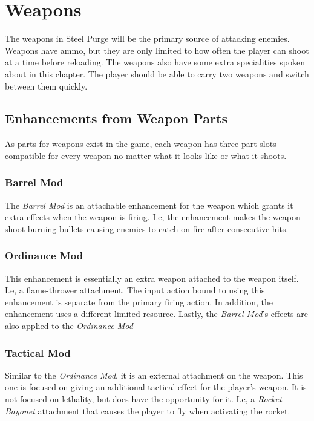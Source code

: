 \documentclass[../Main.tex]{subfiles}
\begin{document}
\section{Weapons}

The weapons in Steel Purge will be the primary source of attacking enemies. Weapons have ammo, but they are only limited to how often the player can shoot at a time before reloading. The weapons also have some extra specialities spoken about in this chapter. The player should be able to carry two weapons and switch between them quickly.

\subsection{Enhancements from Weapon Parts}

As parts for weapons exist in the game, each weapon has three part slots compatible for every weapon no matter what it looks like or what it shoots.

\subsubsection{Barrel Mod}

The \emph{Barrel Mod} is an attachable enhancement for the weapon which grants it extra effects when the weapon is firing. I.e, the enhancement makes the weapon shoot burning bullets causing enemies to catch on fire after consecutive hits. 

\subsubsection{Ordinance Mod}

This enhancement is essentially an extra weapon attached to the weapon itself. I.e, a flame-thrower attachment. The input action bound to using this enhancement is separate from the primary firing action. In addition, the enhancement uses a different limited resource. Lastly, the \emph{Barrel Mod}'s effects are also applied to the \emph{Ordinance Mod}

\subsubsection{Tactical Mod}

Similar to the \emph{Ordinance Mod}, it is an external attachment on the weapon. This one is focused on giving an additional tactical effect for the player's weapon. It is not focused on lethality, but does have the opportunity for it. I.e, a \emph{Rocket Bayonet} attachment that causes the player to fly when activating the rocket. 
\end{document}
